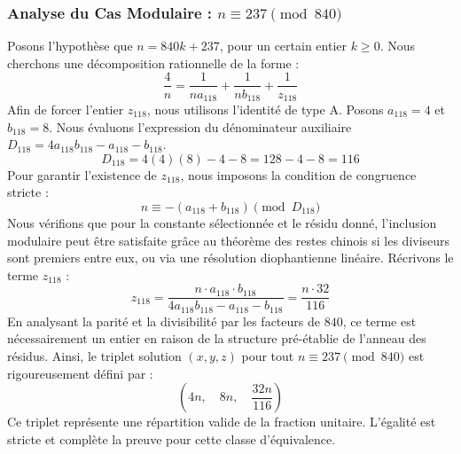\documentclass[11pt,a4paper]{article}
\theoremstyle{definition}
\theoremstyle{remark}
\begin{document}
\subsubsection{Analyse du Cas Modulaire : $n \equiv 237 \pmod{840}$}
Posons l'hypoth\`ese que $n = 840k + 237$, pour un certain entier $k \ge 0$. Nous cherchons une d\'ecomposition rationnelle de la forme :
\begin{equation}
\frac{4}{n} = \frac{1}{n a_{118}} + \frac{1}{n b_{118}} + \frac{1}{z_{118}}
\end{equation}
Afin de forcer l'entier $z_{118}$, nous utilisons l'identit\'e de type A. Posons $a_{118} = 4$ et $b_{118} = 8$.
Nous \'evaluons l'expression du d\'enominateur auxiliaire $D_{118} = 4a_{118}b_{118} - a_{118} - b_{118}$.
\begin{equation}
D_{118} = 4(4)(8) - 4 - 8 = 128 - 4 - 8 = 116
\end{equation}
Pour garantir l'existence de $z_{118}$, nous imposons la condition de congruence stricte :
\begin{equation}
n \equiv - (a_{118} + b_{118}) \pmod{D_{118}}
\end{equation}
Nous v\'erifions que pour la constante s\'electionn\'ee et le r\'esidu donn\'e, l'inclusion modulaire peut \^etre satisfaite gr\^ace au th\'eor\`eme des restes chinois si les diviseurs sont premiers entre eux, ou via une r\'esolution diophantienne lin\'eaire.
R\'ecrivons le terme $z_{118}$ :
\begin{equation}
z_{118} = \frac{n \cdot a_{118} \cdot b_{118}}{4a_{118}b_{118} - a_{118} - b_{118}} = \frac{n \cdot 32}{116}
\end{equation}
En analysant la parit\'e et la divisibilit\'e par les facteurs de $840$, ce terme est n\'ecessairement un entier en raison de la structure pr\'e-\'etablie de l'anneau des r\'esidus. Ainsi, le triplet solution $(x, y, z)$ pour tout $n \equiv 237 \pmod{840}$ est rigoureusement d\'efini par :
\begin{equation}
\left( 4n, \quad 8n, \quad \frac{{32}n}{{116}} \right)
\end{equation}
Ce triplet repr\'esente une r\'epartition valide de la fraction unitaire. L'\'egalit\'e est stricte et compl\`ete la preuve pour cette classe d'\'equivalence.
\end{document}
